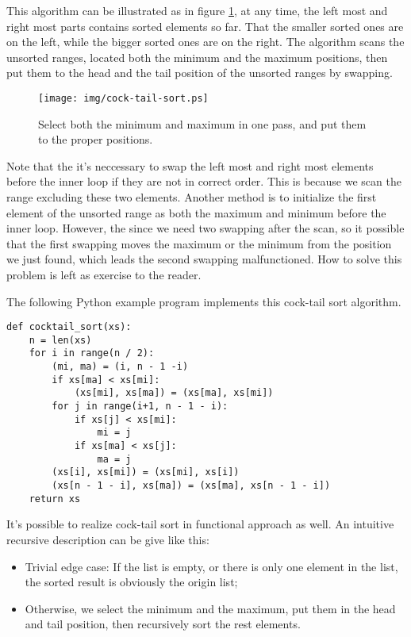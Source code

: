 \documentclass{article}
\begin{document}
This algorithm can be illustrated as in figure \ref{fig:cock-tail-sort}, at any time, the left most and right most
parts contains sorted elements so far. That the smaller sorted ones are on the left, while the bigger sorted ones
are on the right. The algorithm scans the unsorted ranges, located both the minimum and the maximum positions,
then put them to the head and the tail position of the unsorted ranges by swapping.

\begin{figure}[htbp]
  \centering
  \texttt{[image: img/cock-tail-sort.ps]}
  \caption{Select both the minimum and maximum in one pass, and put them to the proper positions.}
  \label{fig:cock-tail-sort}
\end{figure}

Note that the it's neccessary to swap the left most and right most elements before the inner loop if they are
not in correct order. This is because we scan the range excluding these two elements. Another method is to
initialize the first element of the unsorted range as both the maximum and minimum before the inner loop.
However, the since we need two swapping after the scan, so it possible that the first swapping moves
the maximum or the minimum from the position we just found, which leads the second swapping malfunctioned.
How to solve this problem is left as exercise to the reader.

The following Python example program implements this cock-tail sort algorithm.

\lstset{language=Python}
\begin{lstlisting}
def cocktail_sort(xs):
    n = len(xs)
    for i in range(n / 2):
        (mi, ma) = (i, n - 1 -i)
        if xs[ma] < xs[mi]:
            (xs[mi], xs[ma]) = (xs[ma], xs[mi])
        for j in range(i+1, n - 1 - i):
            if xs[j] < xs[mi]:
                mi = j
            if xs[ma] < xs[j]:
                ma = j
        (xs[i], xs[mi]) = (xs[mi], xs[i])
        (xs[n - 1 - i], xs[ma]) = (xs[ma], xs[n - 1 - i])
    return xs
\end{lstlisting}

It's possible to realize cock-tail sort in functional approach as well. An intuitive recursive description
can be give like this:

\begin{itemize}
  \item Trivial edge case: If the list is empty, or there is only one element in the list, the sorted result is obviously the origin list;
  \item Otherwise, we select the minimum and the maximum, put them in the head and tail position, then recursively sort the rest elements.
\end{itemize}
\end{document}
